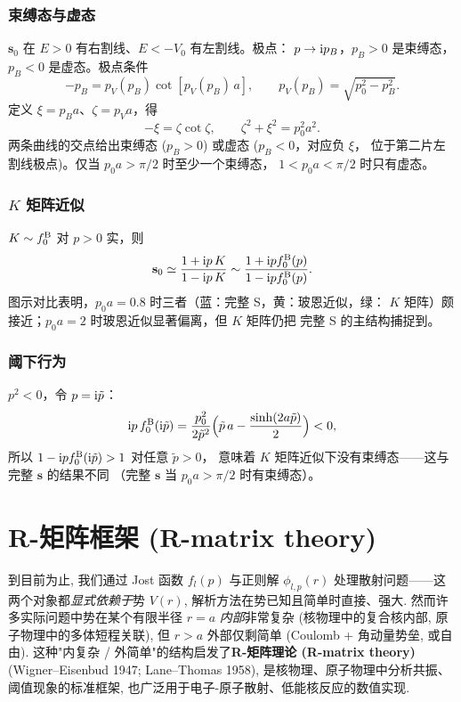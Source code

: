 \subsubsection*{束缚态与虚态}

$\mathbf s_0$ 在 $E>0$ 有右割线、$E<-V_0$ 有左割线。极点：
$p\to\mathrm{i} p_B$，$p_B>0$ 是束缚态，$p_B<0$ 是虚态。极点条件
\begin{equation}
-p_B=p_V(p_B)\cot[p_V(p_B)\,a],\qquad p_V(p_B)=\sqrt{p_0^2-p_B^2}.
\end{equation}
定义 $\xi=p_B a$、$\zeta=p_V a$，得
\begin{equation}
-\xi=\zeta\cot\zeta,\qquad \zeta^2+\xi^2=p_0^2 a^2.
\end{equation}
两条曲线的交点给出束缚态 ($p_B>0$) 或虚态 ($p_B<0$，对应负 $\xi$，
位于第二片左割线极点)。仅当 $p_0 a>\pi/2$ 时至少一个束缚态，
$1<p_0 a<\pi/2$ 时只有虚态。

\subsubsection*{$K$ 矩阵近似}

$K\sim f_0^{\rm B}$ 对 $p>0$ 实，则
\begin{equation}
\mathbf s_0\simeq \frac{1+\mathrm{i} p\,K}{1-\mathrm{i} p\,K}
\sim \frac{1+\mathrm{i} p f_0^{\rm B}(p)}{1-\mathrm{i} p f_0^{\rm B}(p)}.
\end{equation}
图示对比表明，$p_0 a=0.8$ 时三者（蓝：完整 S，黄：玻恩近似，绿：
$K$ 矩阵）颇接近；$p_0 a=2$ 时玻恩近似显著偏离，但 $K$ 矩阵仍把
完整 S 的主结构捕捉到。

\subsubsection*{阈下行为}

$p^2<0$，令 $p=\mathrm{i}\tilde p$：
\[
\mathrm{i} p\,f_0^{\rm B}(\mathrm{i}\tilde p)
= \frac{p_0^2}{2\tilde p^2}\Bigl(\tilde p\,a-\frac{\sinh(2a\tilde p)}{2}\Bigr)<0,
\]
所以 $1-\mathrm{i} p f_0^{\rm B}(\mathrm{i}\tilde p)>1$ 对任意 $\tilde p>0$，
意味着 $K$ 矩阵近似下没有束缚态——这与完整 $\mathbf s$ 的结果不同
（完整 $\mathbf s$ 当 $p_0 a>\pi/2$ 时有束缚态）。

\section{R-矩阵框架 (R-matrix theory)}\label{sec:Rmatrix}

到目前为止, 我们通过 Jost 函数 $f_l(p)$ 与正则解 $\phi_{l,p}(r)$ 处理散射问题——这两个对象都\emph{显式依赖于}势 $V(r)$, 解析方法在势已知且简单时直接、强大. 然而许多实际问题中势在某个有限半径 $r=a$ \emph{内部}非常复杂 (核物理中的复合核内部, 原子物理中的多体短程关联), 但 $r>a$ 外部仅剩简单 (Coulomb + 角动量势垒, 或自由). 这种"内复杂 / 外简单"的结构启发了\textbf{R-矩阵理论 (R-matrix theory)} (Wigner--Eisenbud 1947; Lane--Thomas 1958), 是核物理、原子物理中分析共振、阈值现象的标准框架, 也广泛用于电子-原子散射、低能核反应的数值实现.

